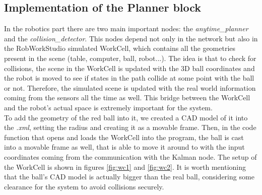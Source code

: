 \subsection{Implementation of the Planner block}
In the robotics part there are two main important nodes: the \textit{anytime\_planner} and the \textit{collision\_detector}. This nodes depend not only in the network but also in the RobWorkStudio simulated WorkCell, which contains all the geometries present in the scene (table, computer, ball, robot...). The idea is that to check for collisions, the scene in the WorkCell is updated with the 3D ball coordinates and the robot is moved to see if states in the path collide at some point with the ball or not. Therefore, the simulated scene is updated with the real world information coming from the sensors all the time as well. This bridge between the WorkCell and the robot's actual space is extremely important for the system. \\

To add the geometry of the red ball into it, we created a CAD model of it into the \textit{.xml}, setting the radius and creating it as a movable frame. Then, in the code function that opens and loads the WorkCell into the program, the ball is cast into a movable frame as well, that is able to move it around to with the input coordinates coming from the communication with the Kalman node. The setup of the WorkCell is shown in figures \ref{fig:wc1} and \ref{fig:wc2}. It is worth mentioning that the ball's CAD model is actually bigger than the real ball, considering some clearance for the system to avoid collisions securely. \\

